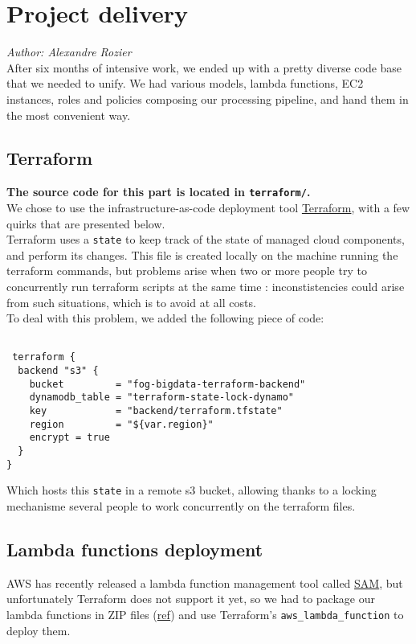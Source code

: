 \section{Project delivery}
\label{sec:project_delivery}
\textit{Author: Alexandre Rozier} \\
After six months of intensive work, we ended up with a pretty diverse code base that we needed to unify. We had various models, lambda functions, EC2 instances, roles and policies composing our processing pipeline, and hand them in the most convenient way.

\subsection{Terraform}

\textbf{The source code for this part is located in \lstinline{terraform/}.}\\
We chose to use the infrastructure-as-code deployment tool \href{https://www.terraform.io/}{Terraform}, with a few quirks that are presented below. \\
Terraform uses a \lstinline{state} to keep track of the state of managed cloud components, and perform its changes. This file is created locally on the machine running the terraform commands, but problems arise when two or more people try to concurrently run terraform scripts at the same time : inconstistencies could arise from such situations, which is to avoid at all costs.\\
To deal with this problem, we added the following piece of code: 
\begin{lstlisting}

 terraform {
  backend "s3" {
    bucket         = "fog-bigdata-terraform-backend"
    dynamodb_table = "terraform-state-lock-dynamo"
    key            = "backend/terraform.tfstate"
    region         = "${var.region}"
    encrypt = true
  }
} 
\end{lstlisting}

Which hosts this \lstinline{state} in a remote s3 bucket, allowing thanks to a locking mechanisme several people to work concurrently on the terraform files.

\subsection{Lambda functions deployment}
AWS has recently released a lambda function management tool called \href{https://docs.aws.amazon.com/serverless-application-model/latest/developerguide/what-is-sam.html}{SAM}, but unfortunately Terraform does not support it yet, so we had to package our lambda functions in ZIP files (\href{https://docs.aws.amazon.com/lambda/latest/dg/lambda-python-how-to-create-deployment-package.html#python-package-dependencies}{ref}) and use Terraform's \lstinline{aws_lambda_function} to deploy them.

